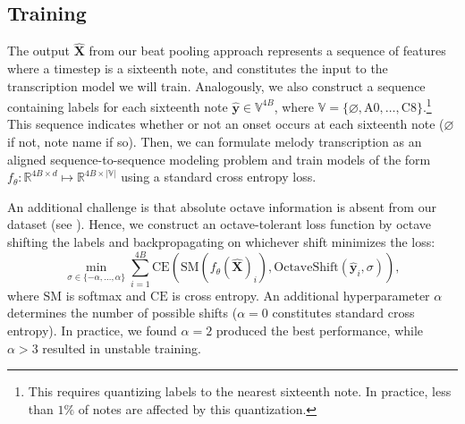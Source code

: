 \subsection{Training}

The output $\hat{\bm{X}}$ from our beat pooling approach represents a sequence of features where a timestep is a sixteenth note, and constitutes the input to the transcription model we will train. 
Analogously, we also construct a sequence containing labels for each sixteenth note ${\hat{\bm{y}} \in \mathbb{V}^{4B}}$, where 
${\mathbb{V} = \{\varnothing, \text{A0}, \ldots, \text{C8}\}}$.\footnote{This requires quantizing labels to the nearest sixteenth note. In practice, less than $1\%$ of notes are affected by this quantization.
} 
This sequence indicates whether or not an onset occurs at each sixteenth note ($\varnothing$ if not, note name if so). 
Then, we can formulate melody transcription as an aligned sequence-to-sequence modeling problem and train models of the form ${f_{\theta} : \mathbb{R}^{4B \times d} \mapsto \mathbb{R}^{4B \times |\mathbb{V}|}}$ using a standard cross entropy loss. 

An additional challenge is that absolute octave information is absent from our dataset (see ). 
Hence, we construct an octave-tolerant loss function by octave shifting the labels and backpropagating on whichever shift minimizes the loss:
\begin{equation*}
\operatorname*{min}_{\sigma \in \{-\alpha, \ldots, \alpha\}} \sum_{i=1}^{4B} \text{CE}(\text{SM}(f_{\theta}(\bm{\hat{X}})_i), \text{OctaveShift}(\hat{\bm{y}}_i, \sigma)), 
\end{equation*}
where $\text{SM}$ is softmax and $\text{CE}$ is cross entropy. 
An additional hyperparameter $\alpha$ determines the number of possible shifts (${\alpha = 0}$ constitutes standard cross entropy). 
In practice, we found ${\alpha = 2}$ produced the best performance, 
while ${\alpha > 3}$ resulted in unstable training.
